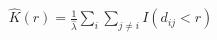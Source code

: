 \documentclass[preview]{standalone}
\begin{document}
\begin{align*}
\hat{K}(r) = \frac{1}{\hat{\lambda}} \sum_{i} \sum_{j \neq i} I(d_{ij} < r)
\end{align*}
\end{document}
